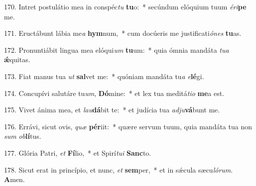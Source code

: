 170. Intret postulátio mea in conspéc\textit{tu} \textbf{tu}o:~*  secúndum elóquium tuum \textit{é}\textit{ri}\textbf{pe} me.\

171. Eructábunt lábia me\textit{a} \textbf{hym}num,~*  cum docúeris me justificati\textit{ó}\textit{nes} \textbf{tu}as.\

172. Pronuntiábit lingua mea elóqui\textit{um} \textbf{tu}um:~*  quia ómnia mandáta \textit{tu}\textit{a} \textbf{ǽ}quitas.\

173. Fiat manus tua \textit{ut} \textbf{sal}vet me:~*  quóniam mandáta tu\textit{a} \textit{e}\textbf{lé}gi.\

174. Concupívi salutáre tu\textit{um}, \textbf{Dó}mine:~*  et lex tua meditá\textit{ti}\textit{o} \textbf{me}a est.\

175. Vivet ánima mea, et \textit{lau}\textbf{dá}bit te:~*  et judícia tua \textit{ad}\textit{ju}\textbf{vá}bunt me.\

176. Errávi, sicut ovis, \textit{quæ} \textbf{pér}iit:~*  quære servum tuum, quia mandáta tua non \textit{sum} \textit{ob}\textbf{lí}tus.\

177. Glória Patri, \textit{et} \textbf{Fí}lio,~*  et Spirí\textit{tu}\textit{i} \textbf{Sanc}to.\

178. Sicut erat in princípio, et nunc, \textit{et} \textbf{sem}per,~*  et in sǽcula sæcu\textit{ló}\textit{rum}. \textbf{A}men.\

